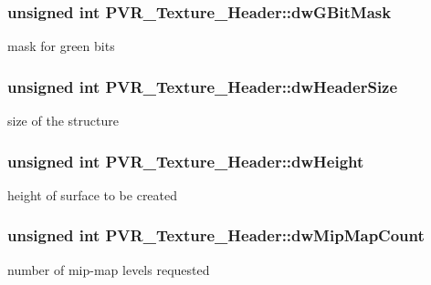 \subsubsection[{\texorpdfstring{dw\+G\+Bit\+Mask}{dwGBitMask}}]{\setlength{\rightskip}{0pt plus 5cm}unsigned int P\+V\+R\+\_\+\+Texture\+\_\+\+Header\+::dw\+G\+Bit\+Mask}\hypertarget{struct_p_v_r___texture___header_a2acd87653ac81f7d304112b48e92bec8}{}\label{struct_p_v_r___texture___header_a2acd87653ac81f7d304112b48e92bec8}
mask for green bits 
\subsubsection[{\texorpdfstring{dw\+Header\+Size}{dwHeaderSize}}]{\setlength{\rightskip}{0pt plus 5cm}unsigned int P\+V\+R\+\_\+\+Texture\+\_\+\+Header\+::dw\+Header\+Size}\hypertarget{struct_p_v_r___texture___header_a1b70d66c96e4291a170028d0ba6bac0e}{}\label{struct_p_v_r___texture___header_a1b70d66c96e4291a170028d0ba6bac0e}
size of the structure 
\subsubsection[{\texorpdfstring{dw\+Height}{dwHeight}}]{\setlength{\rightskip}{0pt plus 5cm}unsigned int P\+V\+R\+\_\+\+Texture\+\_\+\+Header\+::dw\+Height}\hypertarget{struct_p_v_r___texture___header_a5c9d7a15be622005fae8247ea1d593df}{}\label{struct_p_v_r___texture___header_a5c9d7a15be622005fae8247ea1d593df}
height of surface to be created 
\subsubsection[{\texorpdfstring{dw\+Mip\+Map\+Count}{dwMipMapCount}}]{\setlength{\rightskip}{0pt plus 5cm}unsigned int P\+V\+R\+\_\+\+Texture\+\_\+\+Header\+::dw\+Mip\+Map\+Count}\hypertarget{struct_p_v_r___texture___header_a40241f20ad91369c72a9f7285b8c4ff5}{}\label{struct_p_v_r___texture___header_a40241f20ad91369c72a9f7285b8c4ff5}
number of mip-\/map levels requested 
